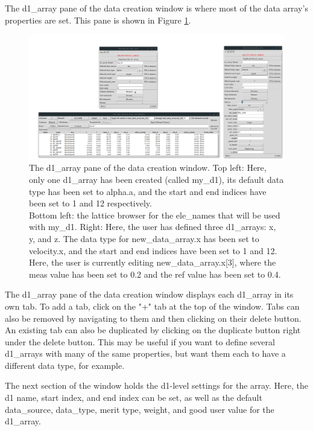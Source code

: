 The d1_array pane of the data creation window is where most of the data array's properties are set.
This pane is shown in Figure \ref{fig:gui.create.data.d1}.
\begin{figure}
\centering
\includegraphics[width=12cm]{figures/create_d1.png}
\caption{The d1_array pane of the data creation window.  Top left: Here, only one d1_array has been created (called my_d1), its default data type has been set to alpha.a, and the start and end indices have been set to 1 and 12 respectively.  \\
Bottom left: the lattice browser for the ele_names that will be used with my_d1.
Right: Here, the user has defined three d1_arrays: x, y, and z.
The data type for new_data_array.x has been set to velocity.x, and the start and end indices have been set to 1 and 12.
Here, the user is currently editing new_data_array.x[3], where the meas value has been set to 0.2 and the ref value has been set to 0.4.}
\label{fig:gui.create.data.d1}
\end{figure}
The d1_array pane of the data creation window displays each d1_array in its own tab.
To add a tab, click on the "+" tab at the top of the window.
Tabs can also be removed by navigating to them and then clicking on their delete button.
An existing tab can also be duplicated by clicking on the duplicate button right under the delete button.
This may be useful if you want to define several d1_arrays with many of the same properties, but want them each to have a different data type, for example.

The next section of the window holds the d1-level settings for the array.
Here, the d1 name, start index, and end index can be set, as well as the default data_source, data_type, merit type, weight, and good user value for the d1_array.

